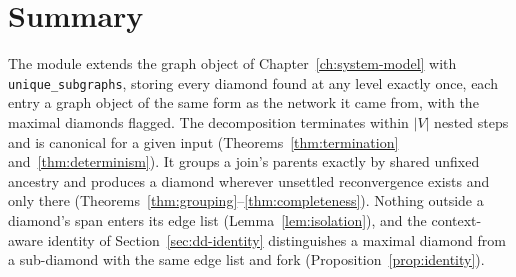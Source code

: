 \documentclass[12pt]{report}
\begin{document}
\section{Summary}
\label{sec:dd-summary}

The module extends the graph object of Chapter~\ref{ch:system-model} with \texttt{unique\_subgraphs}, storing every diamond found at any level exactly once, each entry a graph object of the same form as the network it came from, with the maximal diamonds flagged. The decomposition terminates within $|V|$ nested steps and is canonical for a given input (Theorems~\ref{thm:termination} and~\ref{thm:determinism}). It groups a join's parents exactly by shared unfixed ancestry and produces a diamond wherever unsettled reconvergence exists and only there (Theorems~\ref{thm:grouping}--\ref{thm:completeness}). Nothing outside a diamond's span enters its edge list (Lemma~\ref{lem:isolation}), and the context-aware identity of Section~\ref{sec:dd-identity} distinguishes a maximal diamond from a sub-diamond with the same edge list and fork (Proposition~\ref{prop:identity}).

\ifdefined\maindoc
\else
\printbibliography
\end{document}
